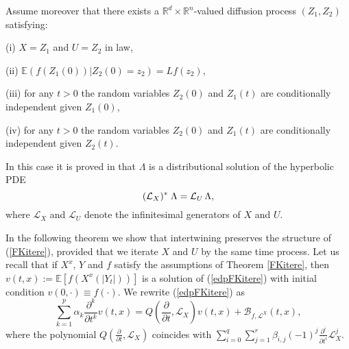 \documentclass[a4paper, 11pt]{article}
\newcommand{\R}{\mathbb{R}}
\newcommand{\E}{\mathbb{E}}
\newcommand{\1}{\mathbf{1}}
\begin{document}
\bigskip
\noindent Assume moreover that there exists a $\R^d\times \R^n$-valued diffusion process $(Z_1,Z_2)$ satisfying:

\noindent (i) $X=Z_1$ and $U=Z_2$ in law,

\noindent (ii) $\E(f(Z_1(0))|Z_2(0)=z_2)=Lf(z_2)$,

\noindent (iii) for any $t>0$ the random variables $Z_2(0)$ and $Z_1(t)$ are conditionally independent given $Z_1(0)$,

\noindent (iv) for any $t>0$ the random variables $Z_2(0)$ and $Z_1(t)$ are conditionally independent given $Z_2(t)$.



\noindent In this case it is proved in \cite{pal} that $\Lambda$ is a distributional solution of the hyperbolic PDE
\begin{equation}\label{edppourLambda}
({\cal L}_X)^* \; \Lambda={\cal L}_U\, \Lambda,
\end{equation}
where $\mathcal{L}_X$ and $\mathcal{L}_U$ denote the infinitesimal generators of $X$ and $U$. 



\bigskip

\noindent In the following theorem we show that intertwining preserves the structure of (\ref{FKitere}), provided that we iterate $X$ and $U$ by the same time process. Let us recall that if $X^x$, $Y$ and $f$ satisfy the assumptions of Theorem \ref{FKitere}, then $v(t,x):=\E \left[f(X^x(|Y_t|))\right]$ is a solution of (\ref{edpFKitere}) with initial condition $v(0,\cdot)\equiv f(\cdot)$. We rewrite (\ref{edpFKitere}) as 
\begin{equation}
\sum_{k=1}^{p} \alpha_k \frac{\partial^k}{\partial t^k}v(t,x)=Q(\frac{\partial}{\partial t},\mathcal{L}_X)v(t,x)+\mathcal{B}_{f,\mathcal{L}^X}(t,x),
\end{equation}
where the polynomial $Q(\frac{\partial}{\partial t},\mathcal{L}_X)$ coincides with $\sum_{i=0}^{q}\sum_{j=1}^{r}\beta_{i,j}(-1)^j\frac{\partial^i}{\partial t^i}\mathcal{L}_X^j$.
\end{document}
